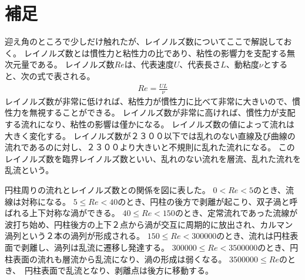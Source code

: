 \documentclass[10pt,b5paper,papersize,dvipdfmx]{jsbook}
\begin{document}
\section{補足}
迎え角のところで少しだけ触れたが、レイノルズ数についてここで解説しておく。
レイノルズ数とは慣性力と粘性力の比であり、粘性の影響力を支配する無次元量である。
レイノルズ数$Re$は、代表速度$U$、代表長さ$L$、動粘度$\nu $とすると、次の式で表される。
\begin{align}
  Re = \frac{UL}{\nu }
\end{align}
レイノルズ数が非常に低ければ、粘性力が慣性力に比べて非常に大きいので、慣性力を無視することができる。
レイノルズ数が非常に高ければ、慣性力が支配する流れになり、粘性の影響は僅かになる。
レイノルズ数の値によって流れは大きく変化する。
レイノルズ数が２３００以下では乱れのない直線及び曲線の流れであるのに対し、２３００より大きいと不規則に乱れた流れになる。
このレイノルズ数を臨界レイノルズ数といい、乱れのない流れを層流、乱れた流れを乱流という。
\par
円柱周りの流れとレイノルズ数との関係を図に表した。
$0<Re<5$のとき、流線は対称になる。
$5\le Re<40$のとき、円柱の後方で剥離が起こり、双子渦と呼ばれる上下対称な渦ができる。
$40\le Re<150$のとき、定常流れであった流線が波打ち始め、円柱後方の上下２点から渦が交互に周期的に放出され、カルマン渦列という２本の渦列が形成される。
$150\le Re<300000$のとき、流れは円柱表面で剥離し、渦列は乱流に遷移し発達する。
$300000\le Re<3500000$のとき、円柱表面の流れも層流から乱流になり、渦の形成は弱くなる。
$3500000\le Re$のとき、　円柱表面で乱流となり、剥離点は後方に移動する。
\end{document}
